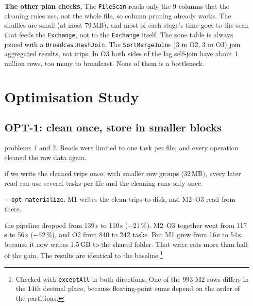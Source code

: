 \documentclass[sigconf]{acmart}
\newcommand{\opt}[1]{\texttt{-{}-opt #1}}
\newenvironment{steps}{\begin{description}[nosep, leftmargin=0pt, font=\normalfont\itshape]}{\end{description}}
\begin{document}
\textbf{The other plan checks.} The \texttt{FileScan} reads only the 9 columns that the cleaning rules use, not the
whole file, so column pruning already works. The shuffles are small (at most 79\,MB), and most of each stage's time goes to
the scan that feeds the \texttt{Exchange}, not to the \texttt{Exchange} itself. The zone table is always joined with a
\texttt{BroadcastHashJoin}. The \texttt{SortMergeJoin}s (3 in O2, 3 in O3) join aggregated results, not trips. In O3
both sides of the lag self-join have about 1 million rows, too many to broadcast. None of them is a bottleneck.

\section{Optimisation Study}
\label{sec:opt}

\subsection{OPT-1: clean once, store in smaller blocks}
\begin{steps}
  \item[What we saw:] problems 1 and 2. Reads were limited to one task per file, and every operation cleaned the raw
    data again.
  \item[What we expected:] if we write the cleaned trips once, with smaller row groups (32\,MB), every later read
    can use several tasks per file and the cleaning runs only once.
  \item[What we changed:] \opt{materialize}. M1 writes the clean trips to disk, and M2--O3 read from there.
  \item[What happened:] the pipeline dropped from 139\,s to 110\,s ($-21$\,\%). M2--O3 together went from 117\,s to
    56\,s ($-52$\,\%), and O2 from 840 to 242 tasks. But M1 grew from 16\,s to 54\,s, because it now writes 1.5\,GB
    to the shared folder. That write eats more than half of the gain. The results are identical to the
    baseline.\footnote{Checked with \texttt{exceptAll} in both directions. One of the 993 M2 rows differs in the 14th
    decimal place, because floating-point sums depend on the order of the partitions.}
\end{steps}
\end{document}
